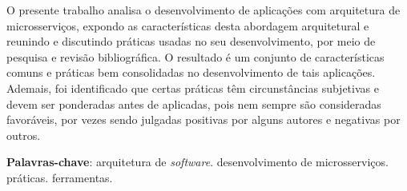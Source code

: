 \setlength{\absparsep}{18pt} %
\begin{resumo}

O presente trabalho analisa o desenvolvimento de aplicações com arquitetura de microsserviços, expondo as características desta abordagem arquitetural e reunindo e discutindo práticas usadas no seu desenvolvimento, por meio de pesquisa e revisão bibliográfica. O resultado é um conjunto de características comuns e práticas bem consolidadas no desenvolvimento de tais aplicações. Ademais, foi identificado que certas práticas têm circunstâncias subjetivas e devem ser ponderadas antes de aplicadas, pois nem sempre são consideradas favoráveis, por vezes sendo julgadas positivas por alguns autores e negativas por outros.



 \textbf{Palavras-chave}: arquitetura de \emph{software}. desenvolvimento de microsserviços. práticas. ferramentas.
\end{resumo}